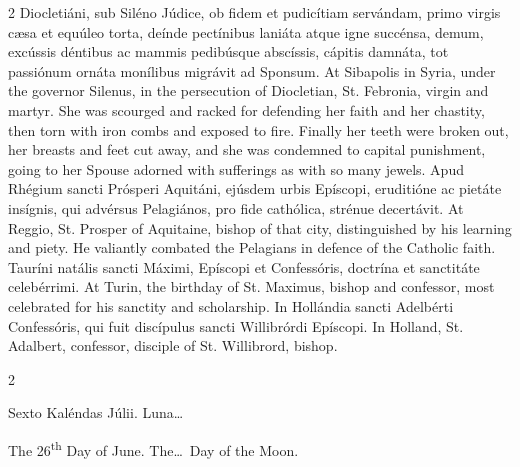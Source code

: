 \begin{paracol}{2}
 Diocletiáni, sub Siléno Júdice, ob fidem et pudicítiam servándam, primo 
 virgis cæsa et equúleo torta, deínde pectínibus laniáta atque igne succénsa, 
 demum, excússis déntibus ac mammis pedibúsque abscíssis, cápitis damnáta, 
 tot passiónum ornáta monílibus migrávit ad Sponsum.
\switchcolumn
{}
At Sibapolis in Syria, under the 
 governor Silenus, in the persecution of Diocletian, St. Febronia, virgin and 
 martyr. She was scourged and racked for defending her faith and her 
 chastity, then torn with iron combs and exposed to fire. Finally her 
 teeth were broken out, her breasts and feet cut away, and she was condemned 
 to capital punishment, going to her Spouse adorned with sufferings as with 
 so many jewels.
\switchcolumn*
{}
Apud Rhégium sancti 
 Prósperi Aquitáni, ejúsdem urbis Epíscopi, eruditióne ac pietáte insígnis, 
 qui advérsus Pelagiános, pro fide cathólica, strénue decertávit.
\switchcolumn
{}
At Reggio, St. Prosper of Aquitaine, 
 bishop of that city, distinguished by his learning and piety. He 
 valiantly combated the Pelagians in defence of the Catholic faith.
\switchcolumn*
{}
Tauríni natális sancti 
 Máximi, Epíscopi et Confessóris, doctrína et sanctitáte celebérrimi.
\switchcolumn
{}
At Turin, the birthday of St. 
 Maximus, bishop and confessor, most celebrated for his sanctity and 
 scholarship.
\switchcolumn*
{}
In Hollándia sancti 
 Adelbérti Confessóris, qui fuit discípulus sancti Willibrórdi Epíscopi.
\switchcolumn
{}
In Holland, St. Adalbert, confessor, 
 disciple of St. Willibrord, bishop.
\switchcolumn*
{}
\end{paracol}


\begin{paracol}{2}
\begin{center}{\color{gregoriocolor} Sexto Kaléndas Júlii. 
 Luna\dots\ }\end{center}
\switchcolumn
{}
\begin{center}{\color{gregoriocolor} The 
 26\textsuperscript{th} Day of 
 June. The\dots\ Day of the Moon.}\end{center}
\end{paracol}

